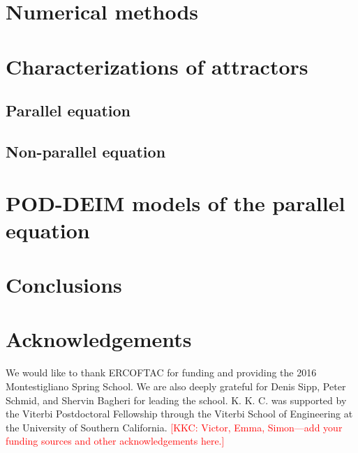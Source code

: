 \documentclass[11pt]{article}
\newcommand{\kkc}[1]{\textcolor{red}{[KKC: #1]}}
\begin{document}
\section{Numerical methods}
\label{sec:methods}

\cite{WeidemanACMTMS00}
\cite{HouJCP07}
\cite{HechtJNM12}

\section{Characterizations of attractors}
\label{sec:attractors}

\subsection{Parallel equation}


\subsection{Non-parallel equation}

\section{POD-DEIM models of the parallel equation}
\label{sec:pod-deim}

\section{Conclusions}
\label{sec:conclusions}

\section{Acknowledgements}

We would like to thank ERCOFTAC for funding and providing the 2016 Montestigliano Spring School.
We are also deeply grateful for Denis Sipp, Peter Schmid, and Shervin Bagheri for leading the school.
K. K. C. was supported by the Viterbi Postdoctoral Fellowship through the Viterbi School of Engineering at the University of Southern California.
\kkc{Victor, Emma, Simon---add your funding sources and other acknowledgements here.}


\end{document}

